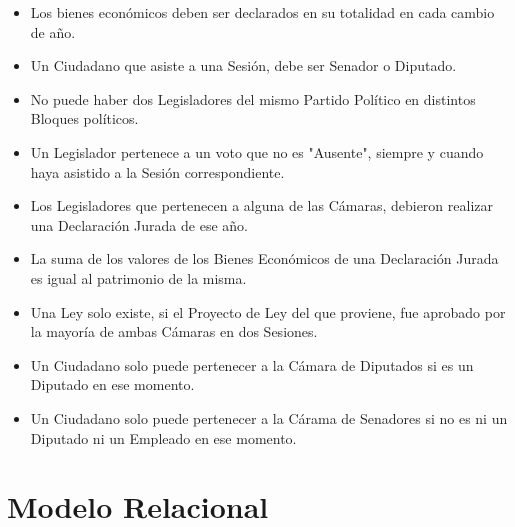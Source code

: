 \begin{itemize}
	\item Los bienes económicos deben ser declarados en su totalidad en cada cambio de año.
	\item Un Ciudadano que asiste a una Sesión, debe ser Senador o Diputado. 
	\item No puede haber dos Legisladores del mismo Partido Político en distintos Bloques políticos. 
	\item Un Legislador pertenece a un voto que no es "Ausente", siempre y cuando haya asistido a la Sesión correspondiente.
	\item Los Legisladores que pertenecen a alguna de las Cámaras, debieron realizar una Declaración Jurada de ese año.
	\item La suma de los valores de los Bienes Económicos de una Declaración Jurada es igual al patrimonio de la misma. 
	\item Una Ley solo existe, si el Proyecto de Ley del que proviene, fue aprobado por la mayoría de ambas Cámaras en dos Sesiones. 
	\item Un Ciudadano solo puede pertenecer a la Cámara de Diputados si es un Diputado en ese momento.
	\item Un Ciudadano solo puede pertenecer a la Cárama de Senadores si no es ni un Diputado ni un Empleado en ese momento. 	
	
\end{itemize}

\newpage

\section{Modelo Relacional}

